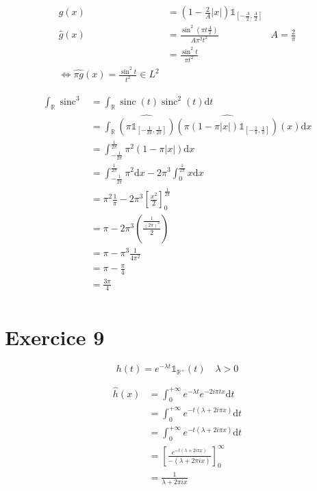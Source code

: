 \documentclass{article}
\renewcommand{\d}{\mathrm{d}}
\newcommand{\R}{\mathbb{R}}
\newcommand{\sinc}{\operatorname{sinc}}
\begin{document}
\begin{align*}
	g(x) &= (1 - \frac{2}{A}|x|) \mathbb{1}_{[-\frac{A}{2}, \frac{A}{2}]} \\
	\widehat{g}(x) &= \frac{\sin^2(\pi t \frac{A}{2})}{A \pi^2 t^2} \quad& A = \frac{2}{\pi} \\
	&= \frac{\sin^2 t}{\pi t^2} \\
	\iff \widehat{\pi g}(x) = \frac{\sin^2 t}{t^2} \in L^2
\end{align*}

\begin{align*}
	\int_\R \sinc ^3 &= \int_\R \sinc(t) \sinc^2(t) \d t \\
		 &= \int_\R \widehat{(\pi \mathbb{1}_{[ - \frac{1}{2\pi}, \frac{1}{2\pi}]})} \widehat{\left( \pi (1 - \pi |x|) \mathbb{1}_{[-\frac{1}{\pi}, \frac{1}{\pi}]} \right) }(x) \d x \\
		 &= \int_{-\frac{1}{2\pi}}^{\frac{1}{2\pi}} \pi^2(1 - \pi |x|)\d x \\
		 &= \int_{-\frac{1}{2\pi}}^{\frac{1}{2\pi}} \pi^2 \d x - 2 \pi ^3 \int_0^{\frac{1}{2\pi}} x \d x \\
		 &= \pi^2 \frac{1}{\pi} - 2 \pi^3 \left[ \frac{x^2}{2} \right]_0^{\frac{1}{2\pi}} \\
		 &= \pi - 2\pi^3 \left( \frac{\frac{1}{(2 \pi)^2}}{2} \right)  \\
		 &= \pi - \pi^3 \frac{1}{4 \pi ^2} \\
		 &= \pi - \frac{\pi}{4} \\
		 &=  \frac{3\pi}{4} \\
\end{align*}


\section{Exercice 9}

\[
	h(t) = e^{-\lambda t} \mathbb{1}_{\R^+}(t) \quad \lambda > 0
\] 

\begin{align*}
	\hat{h}(x) &= \int_0^{+\infty} e^{-\lambda t} e^{-2i\pi t x} \d t \\
	&= \int_{0}^{+\infty} e^{-t(\lambda + 2i \pi x)} \d t \\
	&=  \int_0^{+\infty} e^{-t(\lambda + 2i \pi x)} \d t \\
	&= \left[ \frac{e^{-t(\lambda + 2i \pi x)}}{-(\lambda + 2 \pi ix)} \right]_0^{\infty} \\
	&= \frac{1}{\lambda + 2\pi i x} \\
\end{align*}
\end{document}
